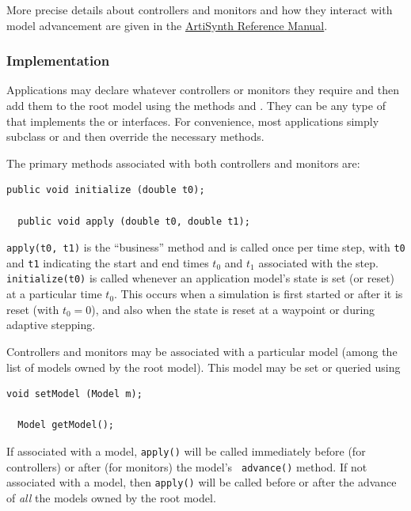 More precise details about controllers and monitors and how they
interact with model advancement are given in the
\href{../artisynth/artisynth.html}{
ArtiSynth Reference Manual}.

\subsubsection{Implementation}
\label{ControllerImplementation:sec}

Applications may declare whatever controllers or monitors they require
and then add them to the root model using the methods
 and
.
They can be any type of
 that implements
the  or
 interfaces.  For
convenience, most applications simply subclass
 or
 and then override
the necessary methods.

The primary methods associated with both controllers and
monitors are:
%
\begin{lstlisting}[]
  public void initialize (double t0);

  public void apply (double t0, double t1);
\end{lstlisting}
%
{\tt apply(t0, t1)} is the ``business'' method and is called once per
time step, with {\tt t0} and {\tt t1} indicating the start and end
times $t_0$ and $t_1$ associated with the step.  {\tt initialize(t0)}
is called whenever an application model's state is set (or reset) at a
particular time $t_0$. This occurs when a simulation is first started
or after it is reset (with $t_0 = 0$), and also when the state is
reset at a waypoint or during adaptive stepping.

Controllers and monitors may be associated with a particular model
(among the list of models owned by the root model). This model may be
set or queried using
%
\begin{lstlisting}[]
  void setModel (Model m);

  Model getModel();
\end{lstlisting}
%
If associated with a model, {\tt apply()} will be called immediately
before (for controllers) or after (for monitors) the model's {\tt
advance()} method. If not associated with a model, then {\tt apply()}
will be called before or after the advance of {\it all} the models
owned by the root model.

